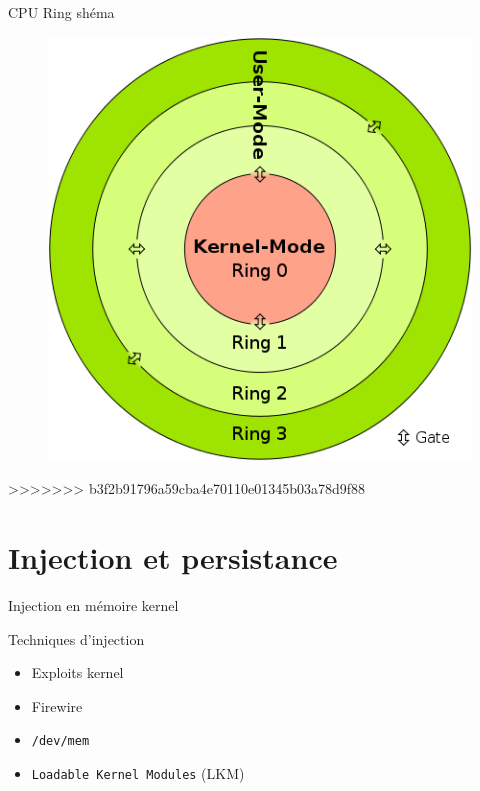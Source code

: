 \documentclass[10pt]{beamer}
\begin{document}
		\begin{frame}{CPU Ring shéma}

    		\begin{figure}
				\begin{center}
					\includegraphics[scale=0.4]{ring.png}
				\end{center}
  		  	\end{figure}	
			
		\end{frame}		
>>>>>>> b3f2b91796a59cba4e70110e01345b03a78d9f88

\section{Injection et persistance}

	\begin{frame}{Injection en mémoire kernel}
		\begin{alertblock}{Techniques d'injection}
	    \end{alertblock}
		\vspace{-0.60cm}
		\begin{itemize}
			\item Exploits kernel
			\item Firewire
			\item\texttt{/dev/mem}
			\item \texttt{Loadable Kernel Modules} (LKM)
		\end{itemize}
	\end{frame}
\end{document}
